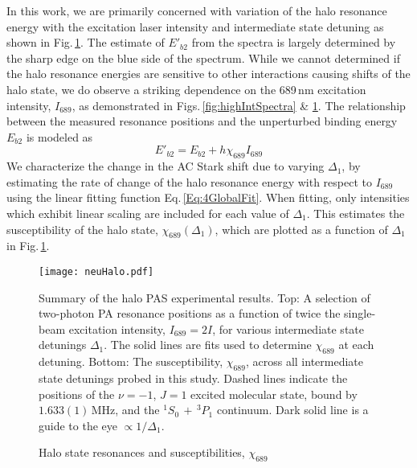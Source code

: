 In this work, we are primarily concerned with variation of the halo resonance energy with the excitation laser intensity and intermediate state detuning as shown in Fig.\,\ref{fig:neuHalo}.
The estimate of $E'_{b2}$ from the spectra is largely determined by the sharp edge on the blue side of the spectrum.
While we cannot determined if the halo resonance energies are sensitive to other interactions causing shifts of the halo state, we do observe a striking dependence on the 689\,nm excitation intensity, $I_{689}$, as demonstrated in Figs.\,\ref{fig:highIntSpectra} \& \ref{fig:neuHalo}.
The relationship between the measured resonance positions and the unperturbed binding energy $E_{b2}$ is modeled as
\begin{equation}\label{Eq:4GlobalFit}
	E'_{b2} = E_{b2} + h\chi_{689}I_{689}
\end{equation}
We characterize the change in the AC Stark shift due to varying $\Delta_1$, by estimating the rate of change of the halo resonance energy with respect to $I_{689}$ using the linear fitting function Eq.\,\ref{Eq:4GlobalFit}.
When fitting, only intensities which exhibit linear scaling are included for each value of $\Delta_1$.
This estimates the susceptibility of the halo state, $\chi_{689}(\Delta_1)$, which are plotted as a function of $\Delta_1$ in Fig.\,\ref{fig:neuHalo}.
	\begin{figure}
	\centerline{
	  \texttt{[image: neuHalo.pdf]}}
	  \caption{Halo state resonances and susceptibilities, $\chi_{689}$}{Summary of the halo PAS experimental results. Top: A selection of two-photon PA resonance positions as a function of twice the single-beam excitation intensity, $I_{689} = 2I$, for various intermediate state detunings $\Delta_1$. The solid lines are fits used to determine $\chi_{689}$ at each detuning. Bottom: The susceptibility, $\chi_{689}$, across all intermediate state detunings probed in this study. Dashed lines indicate the positions of the $\nu=-1$, $J=1$ excited molecular state, bound by $1.633(1)$\,MHz, and the $^1S_0\,+\,^3P_1$ continuum. Dark solid line is a guide to the eye $\propto 1/\Delta_1$.}
	   \label{fig:neuHalo}
	\end{figure}
	
%	
	
